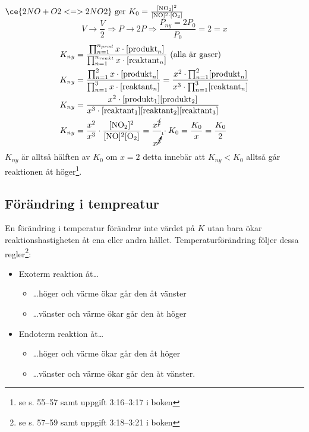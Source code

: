 \begin{exm}
    $\ce{2NO + O2 <=> 2NO2} \mathrm{\ ger \ } K_0=\frac{\mathrm{[NO_2]^2}}{\mathrm{[NO]^2 \cdot [O_2]}}$
    \begin{equation*}
        V \rightarrow \frac{V}{2} \Rightarrow P \rightarrow 2P \Rightarrow \frac{P_{ny}=2P_0}{P_0} = 2 = x
    \end{equation*}
    \begin{align*}
        K_{ny} &= \frac{\prod^{n_{prod}}_{n=1} x \cdot [\mathrm{produkt}_n]}{\prod^{n_{reakt}}_{n=1} x \cdot [\mathrm{reaktant}_n]} \text{ (alla är gaser)} \\
        K_{ny} &= \frac{\prod^{2}_{n=1} x \cdot [\mathrm{produkt}_n]}{\prod^{3}_{n=1} x \cdot [\mathrm{reaktant}_n]} = \frac{x^2 \cdot \prod^{2}_{n=1} [\mathrm{produkt}_n]}{x^3 \cdot \prod^{3}_{n=1} [\mathrm{reaktant}_n]} \\
        K_{ny} &= \frac{x^2 \cdot \mathrm{[produkt_1][produkt_2]}}{x^3 \cdot \mathrm{[reaktant_1][reaktant_2][reaktant_3]}} \\
        K_{ny} &= \frac{x^2}{x^3} \cdot \frac{\mathrm{[NO_2]^2}}{\mathrm{[NO]^2[O_2]}} = \frac{x^{\cancel{2}}}{x^{\cancelto{1}{3}}} \cdot K_0 = \frac{K_0}{x} = \frac{K_0}{2}
    \end{align*}
    $K_{ny}$ är alltså hälften av $K_0$ om $x=2$ detta innebär att $K_{ny} < K_0$ alltså går reaktionen åt höger\footnote{se s. 55--57 samt uppgift 3:16--3:17 i boken}.
\end{exm}

\pagebreak

\subsection{Förändring i tempreatur}
En förändring i temperatur förändrar inte värdet på $K$ utan bara ökar reaktionshastigheten åt ena eller andra hållet. Temperaturförändring följer dessa regler\footnote{se s. 57--59 samt uppgift 3:18--3:21 i boken}:
\begin{itemize}
    \item Exoterm reaktion åt\ldots
    \begin{itemize}
        \item \ldots höger och värme ökar går den åt vänster
        \item \ldots vänster och värme ökar går den åt höger
    \end{itemize}
    \item Endoterm reaktion åt\ldots
    \begin{itemize}
        \item \ldots höger och värme ökar går den åt höger
        \item \dots vänster och värme ökar går den åt vänster.
    \end{itemize}
\end{itemize}